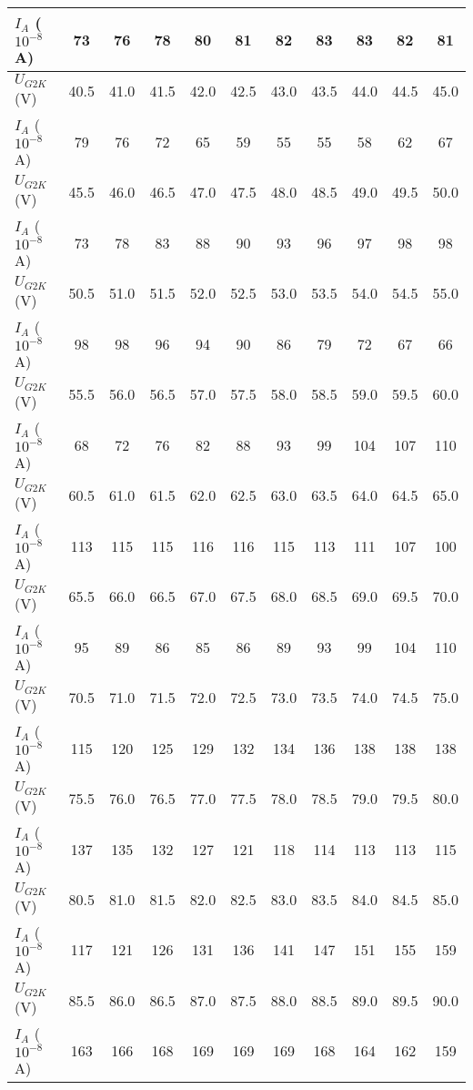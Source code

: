 \documentclass[]{../template/Report}%
\begin{document}
\begin{fullreportonly}
\begin{table}[H]
{\begin{tabular}{|l|*{10}{C|}}
\hline
$I_A$ ($10^{-8}$A) & 73 & 76 & 78 & 80 & 81 & 82 & 83 & 83 & 82 & 81 \\
\hline
$U_{G2K}$ (V) & 40.5 & 41.0 & 41.5 & 42.0 & 42.5 & 43.0 & 43.5 & 44.0 & 44.5 & 45.0 \\
\hline
$I_A$ ($10^{-8}$A) & 79 & 76 & 72 & 65 & 59 & 55 & 55 & 58 & 62 & 67 \\
\hline
$U_{G2K}$ (V) & 45.5 & 46.0 & 46.5 & 47.0 & 47.5 & 48.0 & 48.5 & 49.0 & 49.5 & 50.0 \\
\hline
$I_A$ ($10^{-8}$A) & 73 & 78 & 83 & 88 & 90 & 93 & 96 & 97 & 98 & 98 \\
\hline
$U_{G2K}$ (V) & 50.5 & 51.0 & 51.5 & 52.0 & 52.5 & 53.0 & 53.5 & 54.0 & 54.5 & 55.0 \\
\hline
$I_A$ ($10^{-8}$A) & 98 & 98 & 96 & 94 & 90 & 86 & 79 & 72 & 67 & 66 \\
\hline
$U_{G2K}$ (V) & 55.5 & 56.0 & 56.5 & 57.0 & 57.5 & 58.0 & 58.5 & 59.0 & 59.5 & 60.0 \\
\hline
$I_A$ ($10^{-8}$A) & 68 & 72 & 76 & 82 & 88 & 93 & 99 & 104 & 107 & 110 \\
\hline
$U_{G2K}$ (V) & 60.5 & 61.0 & 61.5 & 62.0 & 62.5 & 63.0 & 63.5 & 64.0 & 64.5 & 65.0 \\
\hline
$I_A$ ($10^{-8}$A) & 113 & 115 & 115 & 116 & 116 & 115 & 113 & 111 & 107 & 100 \\
\hline
$U_{G2K}$ (V) & 65.5 & 66.0 & 66.5 & 67.0 & 67.5 & 68.0 & 68.5 & 69.0 & 69.5 & 70.0 \\
\hline
$I_A$ ($10^{-8}$A) & 95 & 89 & 86 & 85 & 86 & 89 & 93 & 99 & 104 & 110 \\
\hline
$U_{G2K}$ (V) & 70.5 & 71.0 & 71.5 & 72.0 & 72.5 & 73.0 & 73.5 & 74.0 & 74.5 & 75.0 \\
\hline
$I_A$ ($10^{-8}$A) & 115 & 120 & 125 & 129 & 132 & 134 & 136 & 138 & 138 & 138 \\
\hline
$U_{G2K}$ (V) & 75.5 & 76.0 & 76.5 & 77.0 & 77.5 & 78.0 & 78.5 & 79.0 & 79.5 & 80.0 \\
\hline
$I_A$ ($10^{-8}$A) & 137 & 135 & 132 & 127 & 121 & 118 & 114 & 113 & 113 & 115 \\
\hline
$U_{G2K}$ (V) & 80.5 & 81.0 & 81.5 & 82.0 & 82.5 & 83.0 & 83.5 & 84.0 & 84.5 & 85.0 \\
\hline
$I_A$ ($10^{-8}$A) & 117 & 121 & 126 & 131 & 136 & 141 & 147 & 151 & 155 & 159 \\
\hline
$U_{G2K}$ (V) & 85.5 & 86.0 & 86.5 & 87.0 & 87.5 & 88.0 & 88.5 & 89.0 & 89.5 & 90.0 \\
\hline
$I_A$ ($10^{-8}$A) & 163 & 166 & 168 & 169 & 169 & 169 & 168 & 164 & 162 & 159 \\

\end{tabular}}
\end{table}
\end{fullreportonly}
\end{document}
